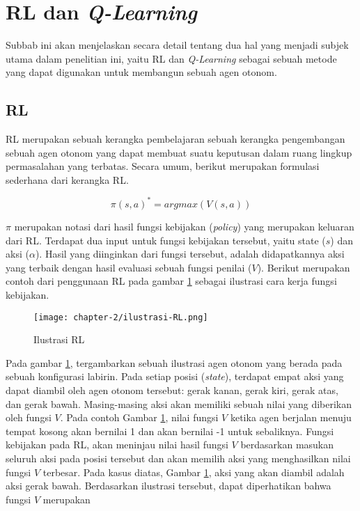 \section{\acl{RL} dan \textit{Q-Learning}}

Subbab ini akan menjelaskan secara detail tentang dua hal yang menjadi subjek utama dalam penelitian ini, yaitu \acl{RL} dan \textit{Q-Learning} sebagai sebuah metode yang dapat digunakan untuk membangun sebuah agen otonom.

\subsection{\acl{RL}}
\label{sub:sub-rl}

\acf{RL} merupakan sebuah kerangka pembelajaran sebuah kerangka pengembangan sebuah agen otonom yang dapat membuat suatu keputusan dalam ruang lingkup permasalahan yang terbatas. Secara umum, berikut merupakan formulasi sederhana dari kerangka \ac{RL}.

\begin{equation}
	\pi(s,a)^* = argmax(V(s,a))
\end{equation}

\(\pi\) merupakan notasi dari hasil fungsi kebijakan (\textit{policy}) yang merupakan keluaran dari \ac{RL}. Terdapat dua input untuk fungsi kebijakan tersebut, yaitu state (\(s\)) dan aksi (\(\alpha\)). Hasil yang diinginkan dari fungsi tersebut, adalah didapatkannya aksi yang terbaik dengan hasil evaluasi sebuah fungsi penilai (\(V\)). Berikut merupakan contoh dari penggunaan \ac{RL} pada gambar \ref{fig:ilustrasi-RL} sebagai ilustrasi cara kerja fungsi kebijakan.

\begin{figure}[h]
	\centering
	\texttt{[image: chapter-2/ilustrasi-RL.png]}
	\caption{Ilustrasi \ac{RL}}
	\label{fig:ilustrasi-RL}
\end{figure}


Pada gambar \ref{fig:ilustrasi-RL}, tergambarkan sebuah ilustrasi agen otonom yang berada pada sebuah konfigurasi labirin. Pada setiap posisi (\textit{state}), terdapat empat aksi yang dapat diambil oleh agen otonom tersebut: gerak kanan, gerak kiri, gerak atas, dan gerak bawah. Masing-masing aksi akan memiliki sebuah nilai yang diberikan oleh fungsi \(V\). Pada contoh Gambar \ref{fig:ilustrasi-RL}, nilai fungsi \(V\) ketika agen berjalan menuju tempat kosong akan bernilai 1 dan akan bernilai -1 untuk sebaliknya. Fungsi kebijakan pada \ac{RL}, akan meninjau nilai hasil fungsi \(V\) berdasarkan masukan seluruh aksi pada posisi tersebut dan akan memilih aksi yang menghasilkan nilai fungsi \(V\) terbesar. Pada kasus diatas, Gambar \ref{fig:ilustrasi-RL}, aksi yang akan diambil adalah aksi gerak bawah. Berdasarkan ilustrasi tersebut, dapat diperhatikan bahwa fungsi \(V\) merupakan

